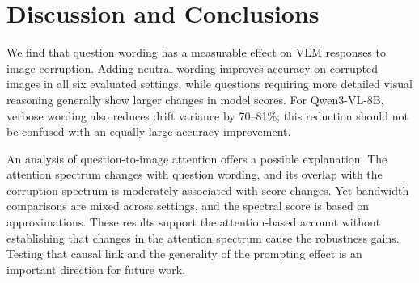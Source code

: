 \documentclass[10pt,twocolumn,letterpaper]{article}
\newcommand{\Csem}{C_{\mathrm{sem}}}
\newcommand{\Wt}{W_t(\omega)}
\begin{document}




\section{Discussion and Conclusions}
\label{sec:conclusion}
We find that question wording has a measurable effect on VLM responses to image corruption. Adding neutral wording improves accuracy on corrupted images in all six evaluated settings, while questions requiring more detailed visual reasoning generally show larger changes in model scores. For Qwen3-VL-8B, verbose wording also reduces drift variance by 70--81\%; this reduction should not be confused with an equally large accuracy improvement.

An analysis of question-to-image attention offers a possible explanation. The attention spectrum changes with question wording, and its overlap with the corruption spectrum is moderately associated with score changes. Yet bandwidth comparisons are mixed across settings, and the spectral score is based on approximations. These results support the attention-based account without establishing that changes in the attention spectrum cause the robustness gains. Testing that causal link and the generality of the prompting effect is an important direction for future work.
\end{document}

